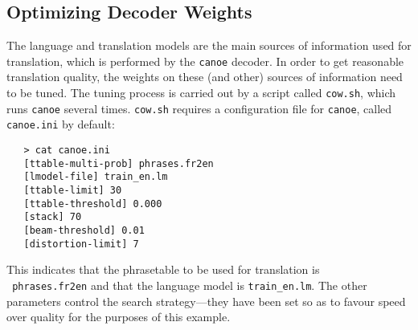 \documentclass[11pt]{article}
\begin{document}
\subsection{Optimizing Decoder Weights} \label{COW}

The language and translation models are the main sources of information used
for translation, which is performed by the {\tt canoe} decoder. In order to get
reasonable translation quality, the weights on these (and other) sources of
information need to be tuned. The tuning process is carried out by a script
called {\tt cow.sh}, which runs {\tt canoe} several times. {\tt cow.sh}
requires a configuration file for {\tt canoe}, called {\tt canoe.ini} by
default:
\begin{verbatim}
   > cat canoe.ini
   [ttable-multi-prob] phrases.fr2en
   [lmodel-file] train_en.lm
   [ttable-limit] 30
   [ttable-threshold] 0.000
   [stack] 70
   [beam-threshold] 0.01
   [distortion-limit] 7
\end{verbatim}
This indicates that the phrasetable to be used for translation is \\ {\tt
  phrases.fr2en} and that the language model is {\tt train\_en.lm}. The other
parameters control the search strategy---they have been set so as to favour
speed over quality for the purposes of this example.
\end{document}
